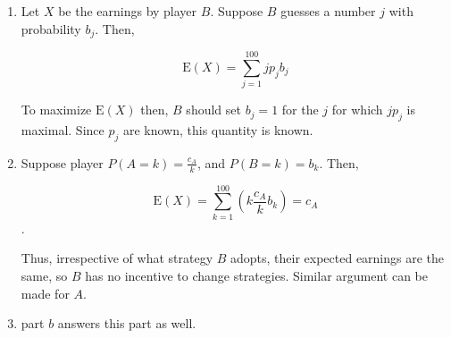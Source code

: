 \begin{enumerate}[label=(\alph*)]
\item Let $X$ be the earnings by player $B$. Suppose $B$ guesses a number $j$
with probability $b_{j}$. Then,

$$\text{E}(X) = \sum_{j=1}^{100}jp_{j}b_{j}$$

To maximize $\text{E}(X)$ then, $B$ should set $b_{j} = 1$ for the $j$ for which
$jp_{j}$ is maximal. Since $p_{j}$ are known, this quantity is known.

\item Suppose player $P(A=k) = \frac{c_{A}}{k}$, and $P(B=k) = b_{k}$. Then,

$$\text{E}(X) = \sum_{k=1}^{100}(k\frac{c_{A}}{k}b_{k}) = c_{A}$$.

Thus, irrespective of what strategy $B$ adopts, their expected earnings are the
same, so $B$ has no incentive to change strategies. Similar argument can be made
for $A$.

\item part $b$ answers this part as well.
\end{enumerate}